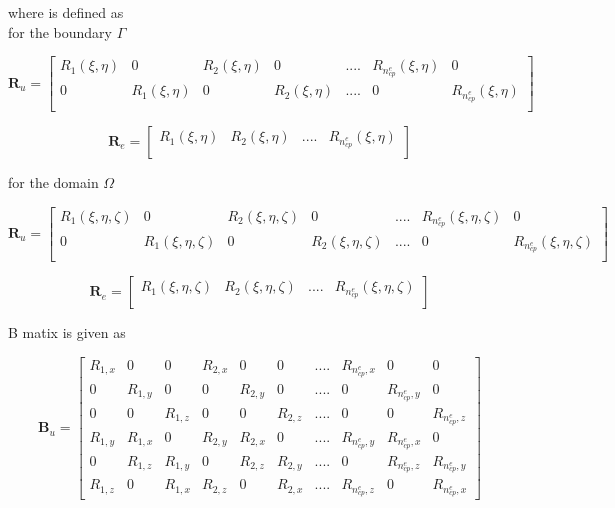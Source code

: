 \documentclass[11pt]{article}
\begin{document}
\noindent
where  is defined as \\
for the boundary $\Gamma$ 

\begin{equation} \label{RMatrix11}
\textbf{R}_u =
\begin{bmatrix}
R_1(\xi,\eta) & 0 & R_2(\xi,\eta) &0 & .... & R_{n_{cp}^e}(\xi,\eta) & 0 \\
0 &R_1(\xi,\eta) & 0 & R_2(\xi,\eta) & .... & 0 & R_{n_{cp}^e}(\xi,\eta) \\
\end{bmatrix}
\end{equation}

\begin{equation} \label{RMatrix12}
\textbf{R}_e =
\begin{bmatrix}
R_1(\xi,\eta) & R_2(\xi,\eta) & .... & R_{n_{cp}^e}(\xi,\eta) \\
\end{bmatrix}
\end{equation}

\noindent
for the domain $\Omega$

\begin{equation} \label{RMatrix21}
\textbf{R}_u =
\begin{bmatrix}
R_1(\xi,\eta,\zeta) & 0 & R_2(\xi,\eta,\zeta) &0 & .... &
R_{n_{cp}^e}(\xi,\eta,\zeta) & 0 \\
0 &R_1(\xi,\eta,\zeta) & 0 & R_2(\xi,\eta,\zeta) & .... & 0 &
R_{n_{cp}^e}(\xi,\eta,\zeta) \\
\end{bmatrix}
\end{equation}

\begin{equation} \label{RMatrix22}
\textbf{R}_e =
\begin{bmatrix}
R_1(\xi,\eta,\zeta) & R_2(\xi,\eta,\zeta) & .... & R_{n_{cp}^e}(\xi,\eta,\zeta)
\\
\end{bmatrix}
\end{equation}

\noindent
B matix is given as

\begin{equation} \label{BuMatrix}
\textbf{B}_u =
\begin{bmatrix}
R_{1,x} & 0 & 0 & R_{2,x} & 0 & 0 & .... & R_{n_{cp}^e,x} & 0 & 0 \\
0 &R_{1,y} & 0 & 0 & R_{2,y} & 0 & .... & 0 & R_{n_{cp}^e,y} & 0  \\
0 & 0 & R_{1,z} &0 & 0 & R_{2,z} & .... &0 & 0 & R_{n_{cp}^e,z}  \\
R_{1,y} & R_{1,x} & 0 & R_{2,y} & R_{2,x} & 0 & .... & R_{n_{cp}^e,y} &
R_{n_{cp}^e,x} & 0 \\
0 & R_{1,z} & R_{1,y} & 0 & R_{2,z} & R_{2,y} & .... & 0 & R_{n_{cp}^e,z} &
R_{n_{cp}^e,y}\\
R_{1,z} &0 & R_{1,x} & R_{2,z} &0 & R_{2,x} & .... &R_{n_{cp}^e,z} &0
&R_{n_{cp}^e,x}
\end{bmatrix}
\end{equation}
\end{document}

